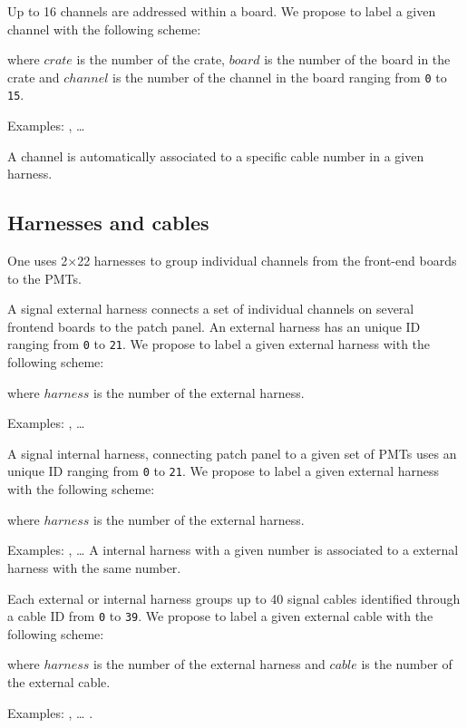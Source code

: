 \vskip 10pt  \par\noindent Up  to 16 channels  are addressed  within a
board.  We propose to label a given channel with the following scheme:
\begin{center}
 \end{center}
where \texttt{$crate$} is the number of the crate, \texttt{$board$} is
the number  of the board  in the  crate and \texttt{$channel$}  is the
number  of  the  channel  in  the board  ranging  from  \texttt{0}  to
\texttt{15}.   \par\noindent Examples:  , \dots
{}

\vskip  10pt A  channel is  automatically associated  to a specific
cable number in a given harness.

\subsection{Harnesses and cables}

One uses 2$\times$22  harnesses to group individual  channels from the
front-end boards to the PMTs.

\vskip 10pt  A signal  external harness connects  a set  of individual
channels on  several frontend boards  to the patch panel.  An external
harness has an  unique ID ranging from \texttt{0}  to \texttt{21}.  We
propose to label a given external harness with the following scheme:
\begin{center}
 \end{center}
where \texttt{$harness$} is the number of the external harness.
\par\noindent Examples: , \dots
{}

\vskip 10pt  A signal  internal harness, connecting  patch panel  to a
given  set of  PMTs  uses  an unique  ID  ranging  from \texttt{0}  to
\texttt{21}.  We  propose to label  a given external harness  with the
following scheme:
\begin{center}
 \end{center}
where \texttt{$harness$} is the number of the external harness.
\par\noindent Examples: , \dots
{}
\vskip 10pt A internal harness with a given number is associated
to a external harness with the same number.

\vskip 10pt Each  external or internal harness groups up  to 40 signal
cables identified through  a cable ID from  \texttt{0} to \texttt{39}.
We propose to label a given external cable with the following scheme:
\begin{center}
 \end{center}
where \texttt{$harness$} is the number of the external harness
and \texttt{$cable$} is the number of the external cable.
\par\noindent Examples: , \dots
{}.

